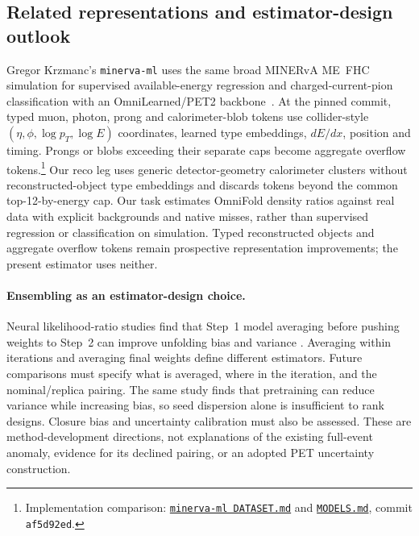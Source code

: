 

\subsection{Related representations and estimator-design outlook}
\label{sec:pet-gregor}
Gregor Krzmanc's \texttt{minerva-ml} uses the same broad MINERvA ME~FHC simulation for supervised available-energy regression and charged-current-pion classification with an OmniLearned/PET2 backbone~\cite{Krzmanc:2026transfer}. At the pinned commit, typed muon, photon, prong and calorimeter-blob tokens use collider-style $(\eta,\phi,\log p_T,\log E)$ coordinates, learned type embeddings, $dE/dx$, position and timing. Prongs or blobs exceeding their separate caps become aggregate overflow tokens.\footnote{Implementation comparison: \href{https://github.com/gregorkrz/minerva-ml/blob/af5d92ed2b3b448a09b6b7cf6b4f179e5757b4ed/DATASET.md}{\texttt{minerva-ml DATASET.md}} and \href{https://github.com/gregorkrz/minerva-ml/blob/af5d92ed2b3b448a09b6b7cf6b4f179e5757b4ed/MODELS.md}{\texttt{MODELS.md}}, commit \texttt{af5d92ed}.} Our reco leg uses generic detector-geometry calorimeter clusters without reconstructed-object type embeddings and discards tokens beyond the common top-12-by-energy cap. Our task estimates OmniFold density ratios against real data with explicit backgrounds and native misses, rather than supervised regression or classification on simulation. Typed reconstructed objects and aggregate overflow tokens remain prospective representation improvements; the present estimator uses neither.

\paragraph{Ensembling as an estimator-design choice.} Neural likelihood-ratio studies find that Step~1 model averaging before pushing weights to Step~2 can improve unfolding bias and variance \cite{ToralesAcosta:2025stabilizing}. Averaging within iterations and averaging final weights define different estimators. Future comparisons must specify what is averaged, where in the iteration, and the nominal/replica pairing. The same study finds that pretraining can reduce variance while increasing bias, so seed dispersion alone is insufficient to rank designs. Closure bias and uncertainty calibration must also be assessed. These are method-development directions, not explanations of the existing full-event anomaly, evidence for its declined pairing, or an adopted PET uncertainty construction.
